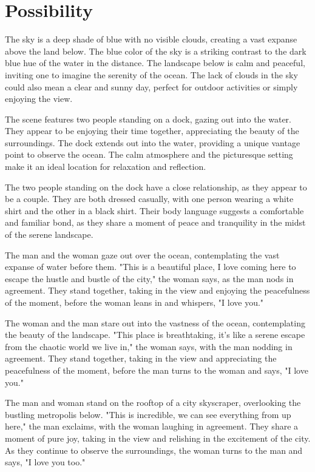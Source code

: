 \documentclass[smalldemyvopaper,11pt,twoside,onecolumn,openright,extrafontsizes]{memoir}
\begin{document}
\chapter{Possibility}
The sky is a deep shade of blue with no visible clouds, creating a vast expanse above the land below. The blue color of the sky is a striking contrast to the dark blue hue of the water in the distance. The landscape below is calm and peaceful, inviting one to imagine the serenity of the ocean. The lack of clouds in the sky could also mean a clear and sunny day, perfect for outdoor activities or simply enjoying the view.\par
The scene features two people standing on a dock, gazing out into the water. They appear to be enjoying their time together, appreciating the beauty of the surroundings. The dock extends out into the water, providing a unique vantage point to observe the ocean. The calm atmosphere and the picturesque setting make it an ideal location for relaxation and reflection.\par
The two people standing on the dock have a close relationship, as they appear to be a couple. They are both dressed casually, with one person wearing a white shirt and the other in a black shirt. Their body language suggests a comfortable and familiar bond, as they share a moment of peace and tranquility in the midst of the serene landscape.\par
The man and the woman gaze out over the ocean, contemplating the vast expanse of water before them. "This is a beautiful place, I love coming here to escape the hustle and bustle of the city," the woman says, as the man nods in agreement. They stand together, taking in the view and enjoying the peacefulness of the moment, before the woman leans in and whispers, "I love you."\par
The woman and the man stare out into the vastness of the ocean, contemplating the beauty of the landscape. "This place is breathtaking, it's like a serene escape from the chaotic world we live in," the woman says, with the man nodding in agreement. They stand together, taking in the view and appreciating the peacefulness of the moment, before the man turns to the woman and says, "I love you."\par
The man and woman stand on the rooftop of a city skyscraper, overlooking the bustling metropolis below. "This is incredible, we can see everything from up here," the man exclaims, with the woman laughing in agreement. They share a moment of pure joy, taking in the view and relishing in the excitement of the city. As they continue to observe the surroundings, the woman turns to the man and says, "I love you too."\par
\end{document}

